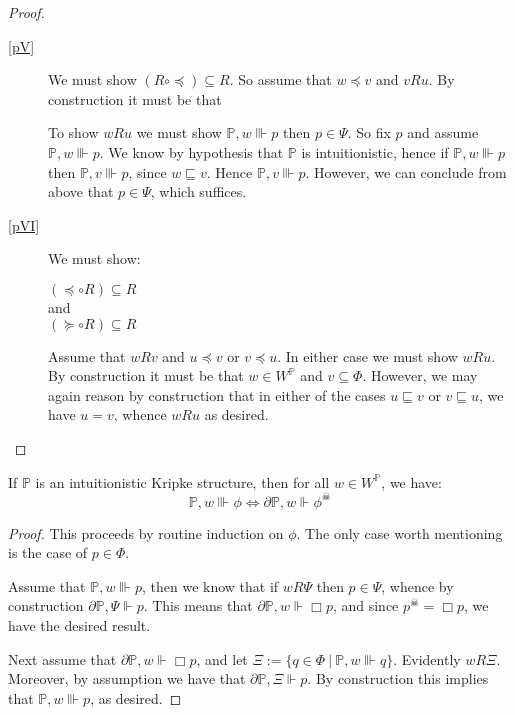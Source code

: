 \begin{proof}
\begin{description}
    \item[\ref{pV}]  We must show $(R \circ \preccurlyeq) \subseteq
      R$.  So assume that $w \preccurlyeq v$ and $v R u$.  By
      construction it must be that 
      To show $w R u$ we must show $\mathbb{P},w \Vvdash p$ 
      then $p \in \Psi$.  So fix $p$ and 
       assume $\mathbb{P},w \Vvdash p$.  We 
      know by hypothesis that $\mathbb{P}$ is intuitionistic, hence 
        if $\mathbb{P},w \Vvdash p$
      then $\mathbb{P},v \Vvdash p$, since $w \sqsubseteq v$.  Hence
      $\mathbb{P},v \Vvdash p$.  However, we can conclude from above
      that $p \in \Psi$, which suffices.
    \item[\ref{pVI}]
We must show:
\begin{center}
 $(\preccurlyeq \circ R)
      \subseteq R$ \\
and\\
    $ (\succcurlyeq \circ R) \subseteq
    R$
\end{center}
Assume that $w R v$ and $u \preccurlyeq v$ or $v \preccurlyeq u$.  In
either case we must show $w R u$.  By construction
      it must be that $w \in W^\mathbb{P}$ and $v \subseteq \Phi$.  
However, we may
      again reason by construction that in either of the cases 
$u \sqsubseteq v$ or $v \sqsubseteq u$, we have $u = v$, whence $w R u$ as desired.

  \end{description}
\end{proof}

\begin{lemma}\label{evilcompanion}
If $\mathbb{P}$ is an intuitionistic Kripke structure, then for all $w
\in W^{\mathbb{P}}$, we have: 
\[\mathbb{P},w\Vvdash \phi \iff \partial \mathbb{P},w \Vdash
\phi^\skull \]
\end{lemma}
\begin{proof}
This proceeds by routine induction on $\phi$.  The only case worth
mentioning is the case of $p \in \Phi$.

Assume that $\mathbb{P},w\Vvdash p$, then we know that if $w R \Psi$
then $p \in \Psi$, whence by construction $\partial \mathbb{P}, \Psi
\Vdash p$.  This means that $\partial \mathbb{P}, w\Vdash \Box p$, and
since $p^\skull = \Box p$, we have the desired result.

Next assume that $\partial \mathbb{P}, w\Vdash \Box p$, and let $\Xi
:= \{ q\in \Phi \ |\ \mathbb{P},w\Vvdash q\}$.  Evidently $w R \Xi$.
Moreover, by assumption we have that $\partial
\mathbb{P}, \Xi \Vdash p$.  By construction this implies that $\mathbb{P},
w\Vvdash p$, as desired.
\end{proof}


